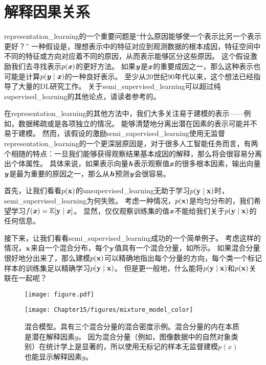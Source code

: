 
\section{解释因果关系}
\label{sec:semi_supervised_disentangling_of_causal_factors}
\gls{representation_learning}的一个重要问题是``什么原因能够使一个表示比另一个表示更好？''
一种假设是，理想表示中的特征对应到观测数据的根本成因，特征空间中不同的特征或方向对应着不同的原因，从而表示能够区分这些原因。
这个假设激励我们去寻找表示$p(\boldsymbol{\mathit{x}})$的更好方法。
如果$\boldsymbol{\mathit{y}}$是$\boldsymbol{\mathit{x}}$的重要成因之一，那么这种表示也可能是计算$p(\boldsymbol{\mathit{y}} \mid \boldsymbol{\mathit{x}})$的一种良好表示。
至少从20世纪90年代以来，这个想法已经指导了大量的\gls{DL}研究工作\citep{Becker92,hinton1999unsupervised}。
关于\gls{semi_supervised_learning}可以超过纯\gls{supervised_learning}的其他论点，请读者参考\cite{Chapelle-2006}的。


在\gls{representation_learning}的其他方法中，我们大多关注易于建模的表示——例如，数据稀疏或是各项独立的情况。
能够清楚地分离出潜在因素的表示可能并不易于建模。
然而，该假设的激励\gls{semi_supervised_learning}使用无监督\gls{representation_learning}的一个更深层原因是，对于很多人工智能任务而言，有两个相随的特点：一旦我们能够获得观察结果基本成因的解释，那么将会很容易分离出个体属性。
具体来说，如果表示向量$\boldsymbol{\mathit{h}}$表示观察值$\boldsymbol{\mathit{x}}$的很多根本因素，输出向量$\boldsymbol{\mathit{y}}$是最为重要的原因之一，那么从$\boldsymbol{\mathit{h}}$预测$\boldsymbol{\mathit{y}}$会很容易。


首先，让我们看看$p(\mathbf{x})$的\gls{unsupervised_learning}无助于学习$p(\mathbf{y}\mid\mathbf{x})$时，\gls{semi_supervised_learning}为何失败。
考虑一种情况，$p(\mathbf{x})$是均匀分布的，我们希望学习$f(\boldsymbol{\mathit{x}}) = \mathbb{E}[\mathbf{y} \mid \boldsymbol{\mathit{x}}]$。
显然，仅仅观察训练集的值$\boldsymbol{\mathit{x}}$不能给我们关于$p(\mathbf{y} \mid \mathbf{x})$的任何信息。


接下来，让我们看看\gls{semi_supervised_learning}成功的一个简单例子。
考虑这样的情况，$\mathbf{x}$来自一个混合分布，每个$\mathbf{y}$值具有一个混合分量，如所示。
如果混合分量很好地分出来了，那么建模$p(\mathbf{x})$可以精确地指出每个分量的方向，每个类一个标记样本的训练集足以精确学习$p(\mathbf{y} \mid \mathbf{x})$。
但是更一般地，什么能将$p(\mathbf{y} \mid \mathbf{x})$和$p(\mathbf{x})$关联在一起呢？

\begin{figure}[!htb]
\ifOpenSource
\centerline{\texttt{[image: figure.pdf]}}
\else
\centerline{\texttt{[image: Chapter15/figures/mixture\_model\_color]}}
\fi
\caption{混合模型。具有三个混合分量的混合密度示例。混合分量的内在本质是潜在解释因素$y$。
因为混合分量（例如，图像数据中的自然对象类别）在统计学上是显著的，所以使用无标记的样本无监督建模$p(x)$也能显示解释因素$y$。
}
\label{fig:chap15_mixture_model}
\end{figure}

